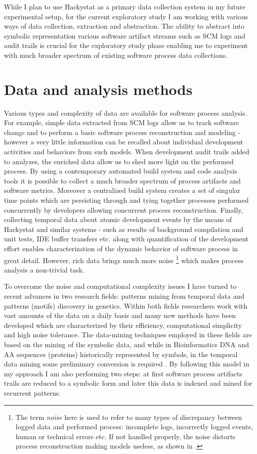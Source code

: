 \documentclass{sig-alternate}
\begin{document}
While I plan to use Hackystat as a primary data collection system in my future experimental setup, for the current exploratory study I am working with various ways of data collection, extraction and abstraction. The ability to abstract into symbolic representation various software artifact streams such as SCM logs and audit trails is crucial for the exploratory study phase enabling me to experiment with much broader spectrum of existing software process data collections.

\section{Data and analysis methods}
Various types and complexity of data are available for software process analysis. For example, simple data extracted from SCM logs allow us to track software change and to perform a basic software process reconstruction and modeling - however a very little information can be recalled about individual development activities and behaviors from such models. When development audit trails added to analyzes, the enriched data allow us to shed more light on the performed process. By using a contemporary automated build system and code analysis tools it is possible to collect a much broader spectrum of process artifacts and software metrics. Moreover a centralized build system creates a set of singular time points which are persisting through and tying together processes performed concurrently by developers allowing concurrent process reconstruction. Finally, collecting temporal data about atomic development events by the means of Hackystat and similar systems - such as results of background compilation and unit tests, IDE buffer transfers etc. along with quantification of the development effort enables characterization of the dynamic behavior of software process in great detail. However, rich data brings much more noise \footnote{The term \textit{noise} here is used to refer to many types of discrepancy between logged data and performed process: incomplete logs, incorrectly logged events, human or technical errors etc. If not handled properly, the noise distorts process reconstruction making models useless, as shown in \cite{citeulike:2678511}.} which makes process analysis a non-trivial task.  

To overcome the noise and computational complexity issues I have turned to recent advances in two research fields: patterns mining from temporal data and patterns (motifs) discovery in genetics. Within both fields researchers work with vast amounts of the data on a daily basis and many new methods have been developed which are characterized by their efficiency, computational simplicity and high noise tolerance. The data-mining techniques employed in these fields are based on the mining of the symbolic data, and while in Bioinformatics DNA and AA sequences (proteins) historically represented by symbols, in the temporal data mining some preliminary conversion is required \cite{citeulike:2821475}. By following this model in my approach I am also performing two steps: at first software process artifacts trails are reduced to a symbolic form and later this data is indexed and mined for recurrent patterns.
\end{document}
